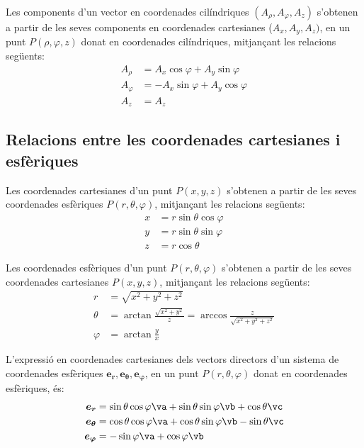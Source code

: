 \documentclass[catalan,a4paper,twoside,11pt]{article}
\begin{document}
Les components d'un vector en coordenades cilíndriques $(A_\rho, A_\varphi, A_z)$ s'obtenen a partir de les seves components en coordenades cartesianes ($A_x, A_y, A_z)$, en un punt $P(\rho,\varphi,z)$ donat en coordenades cilíndriques, mitjançant les relacions següents:
\begin{subequations}\begin{align}
    A_\rho &=  A_x\cos\varphi+A_y\sin\varphi\\
    A_\varphi &= -A_x\sin\varphi+A_y\cos\varphi \\
    A_z &= A_z
\end{align}\end{subequations}


\subsection{Relacions entre les coordenades cartesianes i
esfèriques}

Les coordenades cartesianes  d'un punt $P(x,y,z)$ s'obtenen a partir
de les seves coordenades esfèriques $P(r,\theta,\varphi)$,
mitjançant les relacions següents:
\begin{subequations}\begin{align}
    x &=r\sin\theta\cos\varphi \\ y &=r\sin\theta\sin\varphi \\ z &=r\cos\theta
\end{align}\end{subequations}

Les coordenades  esfèriques  d'un punt $P(r,\theta,\varphi)$
s'obtenen a partir de les seves coordenades cartesianes $P(x,y,z)$,
mitjançant les relacions següents:
\begin{subequations}\begin{align}
    r &=\sqrt{x^2+y^2+z^2}\\
    \theta&=\arctan{\frac{\sqrt{x^2+y^2}}{z}}=\arccos\frac{z}{\sqrt{x^2+y^2+z^2}}\\[1mm]
    \varphi &=\arctan\frac{y}{x}
\end{align}\end{subequations}


L'expressió en coordenades cartesianes dels vectors directors d'un sistema de coordenades  esfèriques $\boldsymbol{e_r},\boldsymbol{e_\theta},\boldsymbol{e_\varphi}$, en un punt $P(r,\theta,\varphi)$ donat en coordenades esfèriques, és:
\begin{subequations}\begin{align}
    \boldsymbol{e_r} &=\sin\theta\cos\varphi\va+ \sin\theta\sin\varphi\vb+\cos\theta\vc\\
    \boldsymbol{e_\theta} &=\cos\theta\cos\varphi\va+
    \cos\theta\sin\varphi\vb-\sin\theta\vc\\
    \boldsymbol{e_\varphi}&=-\sin\varphi\va+\cos\varphi\vb
\end{align}\end{subequations}
\end{document}
